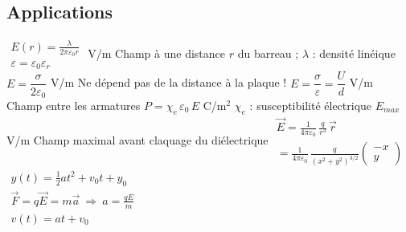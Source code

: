 \subsection{Applications}
\begin{formules}
    {$\begin{gathered}
      E(r) = \frac{\lambda}{2\pi\varepsilon_0 r} \\
      \varepsilon = \varepsilon_0\varepsilon_r
     \end{gathered}$}
    {V/m}
    {Champ à une distance $r$ du barreau ; $\lambda$ : densité linéique}
    {$E = \dfrac{\sigma}{2\varepsilon_0}$}
    {V/m}
    {Ne dépend pas de la distance à la plaque !}
    {$E = \dfrac{\sigma}{\varepsilon} = \dfrac{U}{d}$}
    {V/m}
    {Champ entre les armatures}
    {$P = \chi_e\,\varepsilon_0\,E$}
    {C/m$^2$}
    {$\chi_e$ : susceptibilité électrique}
    {$E_{max}$}
    {V/m}
    {Champ maximal avant claquage du diélectrique}
    {$\begin{gathered}
      \vec E = \frac{1}{4\pi\varepsilon_0}\,\frac{q}{r^3}\,\vec r \\
      = \frac{1}{4\pi\varepsilon_0}\,\frac{q}{(x^2+y^2)^{3/2}}\begin{pmatrix}-x\\ y\end{pmatrix}
     \end{gathered}$}
    {}
    {}
    {$\begin{gathered}
      y(t) = \frac{1}{2}at^2 + v_0t + y_0 \\
      \vec F = q\vec E = m\vec a \ \Rightarrow\ a = \frac{qE}{m} \\
      v(t) = at + v_0
     \end{gathered}$}
    {}
    {}
\end{formules}
